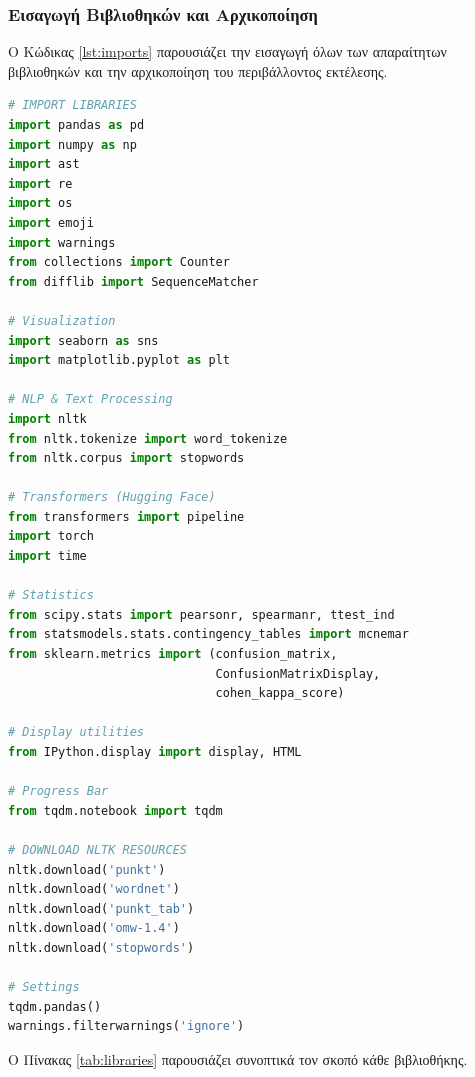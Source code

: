 \documentclass[a4paper,11pt,oneside,openany]{ioniothesis}
\begin{document}
\subsubsection{Εισαγωγή Βιβλιοθηκών και Αρχικοποίηση}

Ο Κώδικας \ref{lst:imports} παρουσιάζει την εισαγωγή όλων των απαραίτητων βιβλιοθηκών και την αρχικοποίηση του περιβάλλοντος εκτέλεσης.

\begin{lstlisting}[language=Python, caption={Εισαγωγή βιβλιοθηκών και αρχικοποίηση περιβάλλοντος}, label={lst:imports}]
# IMPORT LIBRARIES
import pandas as pd
import numpy as np
import ast
import re
import os
import emoji
import warnings
from collections import Counter
from difflib import SequenceMatcher

# Visualization
import seaborn as sns
import matplotlib.pyplot as plt

# NLP & Text Processing
import nltk
from nltk.tokenize import word_tokenize
from nltk.corpus import stopwords

# Transformers (Hugging Face)
from transformers import pipeline
import torch
import time

# Statistics
from scipy.stats import pearsonr, spearmanr, ttest_ind
from statsmodels.stats.contingency_tables import mcnemar
from sklearn.metrics import (confusion_matrix, 
                             ConfusionMatrixDisplay, 
                             cohen_kappa_score)

# Display utilities
from IPython.display import display, HTML

# Progress Bar
from tqdm.notebook import tqdm

# DOWNLOAD NLTK RESOURCES
nltk.download('punkt')
nltk.download('wordnet')
nltk.download('punkt_tab')
nltk.download('omw-1.4')
nltk.download('stopwords')

# Settings
tqdm.pandas()
warnings.filterwarnings('ignore')
\end{lstlisting}

Ο Πίνακας \ref{tab:libraries} παρουσιάζει συνοπτικά τον σκοπό κάθε βιβλιοθήκης.
\end{document}
